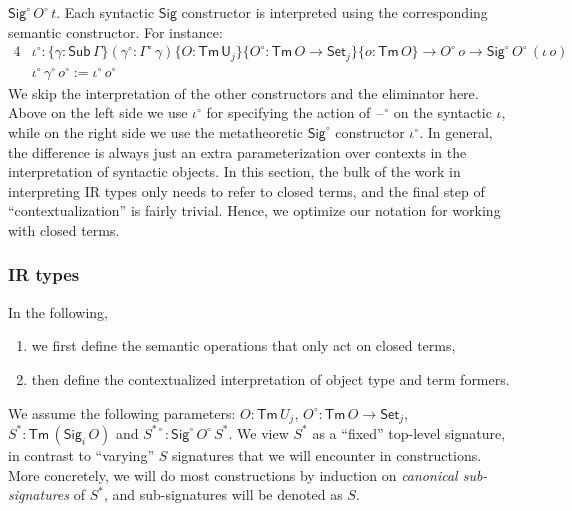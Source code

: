 \documentclass[acmsmall,screen,review,anonymous]{acmart}
\newcommand{\msf}[1]{{\mathsf{#1}}}
\newcommand{\U}{\msf{U}}
\newcommand{\Set}{\msf{Set}}
\newcommand{\Sig}{\msf{Sig}}
\newcommand{\blank}{{\mathord{\hspace{1pt}\text{--}\hspace{1pt}}}}
\newcommand{\Sub}{\msf{Sub}}
\newcommand{\Tm}{\msf{Tm}}
\newcommand{\w}{\circ}
\begin{document}
$\Sig^\w\,O^\w\,t$. Each syntactic $\Sig$ constructor is interpreted using the corresponding
semantic constructor. For instance:
\begin{alignat*}{4}
  &\iota^\w : \{\gamma : \Sub\,\Gamma\}(\gamma^\w : \Gamma^\w\,\gamma)\{O : \Tm\,\U_j\}\{O^\w : \Tm\,O \to \Set_j\}\{o : \Tm\,O\} \to O^\w\,o \to \Sig^\w\,O^\w\,(\iota\,o)\\
  &\iota^\w\,\gamma^\w\,o^\w := \iota^\w\,o^\w
\end{alignat*}
We skip the interpretation of the other constructors and the eliminator here. Above on the left side
we use $\iota^\w$ for specifying the action of $\blank^\w$ on the syntactic $\iota$, while on the
right side we use the metatheoretic $\Sig^\w$ constructor $\iota^\w$. In general, the difference is
always just an extra parameterization over contexts in the interpretation of syntactic objects. In
this section, the bulk of the work in interpreting IR types only needs to refer to closed terms, and
the final step of ``contextualization'' is fairly trivial. Hence, we optimize our notation for
working with closed terms.

\subsubsection{IR types}

In the following,
\begin{enumerate}
\item we first define the semantic operations that only act on closed terms,
\item then define the contextualized interpretation of object type and term formers.
\end{enumerate}
We assume the following parameters: $O : \Tm\,U_j$, $O^\w : \Tm\,O \to \Set_j$, $S^* :
\Tm\,(\Sig_i\,O)$ and $S^{*\w} : \Sig^\w\,O^\w\,S^*$. We view $S^*$ as a ``fixed'' top-level
signature, in contrast to ``varying'' $S$ signatures that we will encounter in constructions. More
concretely, we will do most constructions by induction on \emph{canonical sub-signatures} of $S^*$,
and sub-signatures will be denoted as $S$.
\end{document}
